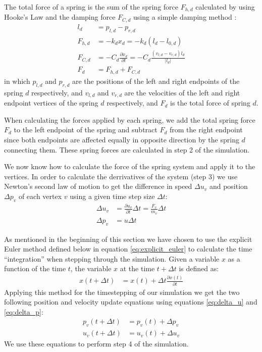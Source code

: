 \documentclass[11pt]{article}
\providecommand{\abs}[1]{\left \lvert #1 \right \rvert}
\begin{document}
The total force of a spring is the sum of the spring force $F_{h,d}$
calculated by using Hooke's Law and the damping force $F_{C,d}$
using a simple damping method : \begin{align}
\nonumber l_d &= p_{l,d} - p_{r,d} \\ \label{eq:hooke} F_{h,d} &= -k_d x_d
= -k_d (l_d - l_{0,d}) \\ \label{eq:damping} F_{C,d} &= -C_d \frac{\partial
x_d}{ \partial t} = - C_d \frac{\left(v_{l,d} - v_{r,d}\right) l_d}{\abs{l_d}}
\\ F_d &= F_{h,d} + F_{C,d} \end{align} \todo{Maybe add direction correction:
    $F_d \cdot (-l_d / \abs{l_d})$} in which $p_{l,d}$ and $p_{r,d}$ are the
positions of the left and right endpoints of the spring $d$ respectively, and
$v_{l,d}$ and $v_{r,d}$ are the velocities of the left and right endpoint
vertices of the spring $d$ respectively, and $F_d$ is the total force of
spring $d$.

When calculating the forces applied by each spring, we add the total spring
force $F_d$ to the left endpoint of the spring and subtract $F_d$ from the
right endpoint since both endpoints are affected equally in opposite direction
by the spring $d$ connecting them. These spring forces are calculated in step
2 of the simulation.

We now know how to calculate the force of the spring system and apply it
to the vertices. In order to calculate the derrivatives of the system
(step 3) we use Newton's second law of motion  to get the
difference in speed $\Delta u_v$ and position $\Delta p_v$ of each vertex $v$
using a given time step size $\Delta t$: \begin{align} \label{eq:delta_u}
\Delta u_v &= \frac{\partial u_v}{\partial t} \Delta t = \frac{F_v}{m_v}
\Delta t \\ \label{eq:delta_p} \Delta p_v &= u \Delta t \end{align}

As mentioned in the beginning of this section we have chosen to use the
explicit Euler method defined below in equation \ref{eq:explicit_euler}
to calculate the time ``integration''  when stepping through
the simulation. Given a variable $x$ as a function of the time $t$, the
variable $x$ at the time $t + \Delta t$ is defined as: \begin{align}
\label{eq:explicit_euler} x(t+\Delta t) &= x(t) + \Delta t \frac{\partial
x(t)}{\partial t} \end{align} Applying this method for the timestepping
of our simulation we get the two following position and velocity update
equations using equations \ref{eq:delta_u} and \ref{eq:delta_p}: \begin{align}
p_v(t+\Delta t) &= p_v(t) + \Delta p_v \\ u_v(t+\Delta t) &= u_v(t) + \Delta
u_v \end{align} We use these equations to perform step 4 of the simulation.
\end{document}
